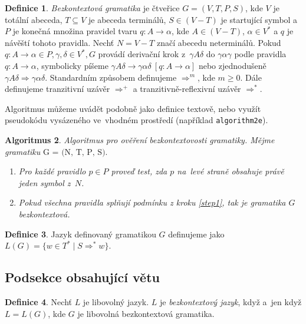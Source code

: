 \documentclass[a4paper, 11pt]{article}
\begin{document}
\theoremstyle{definition}
\newtheorem{definition}{Definice}[section]
\begin{definition}
	\label{def1.1} \emph{Bezkontextová gramatika} je čtveřice $G = (V, T, P,S)$, kde $V$ je totální abeceda,
$T \subseteq V$ je abeceda terminálů, $S \in (V-T)$ je startující symbol a $P$ je konečná množina pravidel
tvaru $q \colon A \rightarrow \alpha$, kde $A \in (V-T)$, $\alpha \in V^*$ a $q$ je návěští tohoto pravidla. Nechť $N = V-T$ značí abecedu neterminálů.
Pokud $q \colon A \rightarrow \alpha \in P,\gamma,\delta \in V^*,G$ provádí derivační krok z~$\gamma A \delta$ do $\gamma \alpha \gamma$ podle pravidla $q \colon A \rightarrow \alpha$, symbolicky píšeme $\gamma A \delta \rightarrow \gamma\alpha\delta\ [q \colon A \rightarrow \alpha]$ nebo zjednodušeně $\gamma A \delta \Rightarrow \gamma \alpha \delta$. Standardním způsobem definujeme $\Rightarrow^m$, kde $m \geq 0$. Dále definujeme tranzitivní uzávěr $\Rightarrow^+$ a tranzitivně-reflexivní uzávěr $\Rightarrow^*$.
\end{definition}

\par Algoritmus můžeme uvádět podobně jako definice textově, nebo využít pseudokódu vysázeného ve~vhodném prostředí (například \texttt{algorithm2e}).

\theoremstyle{definition}
\newtheorem{Algoritmus}[definition]{Algoritmus}
\begin{Algoritmus}
\emph{Algoritmus pro ověření bezkontextovosti gramatiky. Mějme gramatiku} $\mbox{G = (N, T, P, S)}$.
\begin{enumerate}
\item \label{step1}
\emph{Pro každé pravidlo $p \in P$ proveď test, zda $p$ na~levé straně obsahuje právě jeden symbol z~$N$.}
\item 
\emph{Pokud všechna pravidla splňují podmínku z kroku \ref{step1}, tak je gramatika $G$ bezkontextová.}
\end{enumerate}
\end{Algoritmus}

\begin{definition}
Jazyk definovaný gramatikou $G$ definujeme jako $\mbox{$L$}(G) = \{w \in T^* \mid S \Rightarrow^* w\}$.
\end{definition}

\subsection{Podsekce obsahující větu}
\begin{definition}
Nechť $L$ je libovolný jazyk. $L$ je \emph{bezkontextový jazyk}, když a~jen když $L = L(G)$, kde $G$ je libovolná bezkontextová gramatika.
\end{definition}
\end{document}

